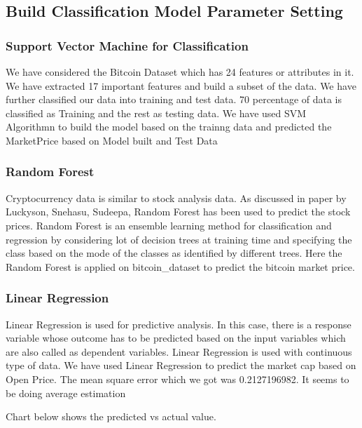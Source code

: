 \documentclass{article}
\begin{document}
\subsection {Build Classification Model Parameter Setting}

\subsubsection {Support Vector Machine for Classification}

We have considered the Bitcoin Dataset which has 24 features or attributes in it. We have extracted 17 important features and build a subset of the data. We have further classified our data into training and test data. 70 percentage of data is classified as Training and the rest as testing data. We have used SVM Algorithmn to build the model based on the trainng data and predicted the Market\textunderscore Price based on Model built and Test Data

\subsubsection{Random Forest}
Cryptocurrency data is similar to stock analysis data. As discussed in paper by Luckyson, Snehasu, Sudeepa, Random Forest has been used to predict the stock prices.
Random Forest is an ensemble learning method for classification and regression by considering lot of decision trees at training time and specifying the class based on the mode of the classes as identified by different trees.
Here the Random Forest is applied on bitcoin\_dataset to predict the bitcoin market price.
 
\subsubsection{Linear Regression}
Linear Regression is used for predictive analysis. In this case, there is a response variable whose outcome has to be predicted based on the input variables which are also called as dependent variables. Linear Regression is used with continuous type of data. We have used Linear Regression to predict the market cap based on Open Price.
The mean square error which we got was  0.2127196982. It seems to be doing average estimation

Chart below shows the predicted vs actual value.
\end{document}
